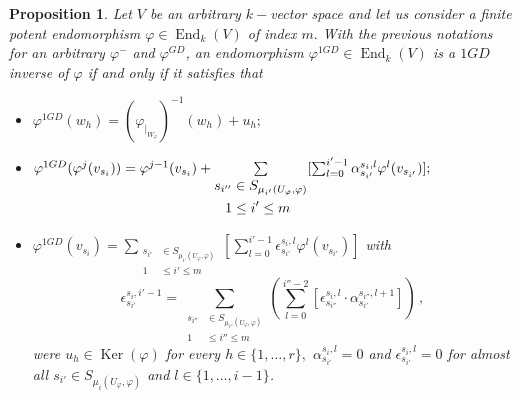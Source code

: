 \documentclass[10pt,a4paper]{amsart}
\newtheorem{prop}[defn]{Proposition}
\theoremstyle{plain}
\theoremstyle{remark}
\numberwithin{equation}{section} \numberwithin{defn}{section}
\newcommand\ed{\operatorname{End}}
\newcommand\Ker{\operatorname{Ker}}
\newcommand{\f}{\varphi}
\begin{document}
\begin{prop}\label{P: Charact1GDFP}
Let $V$ be an arbitrary $k-$vector space and let us consider a finite potent endomorphism $\f \in \ed_k(V)$ of index $m.$ With the previous notations for an arbitrary $\f^-$ and $\f^{GD}$, an endomorphism $\f^{1GD}\in \ed_k(V)$ is a $1GD$ inverse of $\f$ if and only if it satisfies that \begin{itemize}
\item $\f^{1GD}(w_h)=(\f_{\vert_{W_{\f}}})^{-1}(w_h)+u_h;$
\item $\f^{1GD}(\f^j(v_{s_i}))=\f^{j-1}(v_{s_i})+ \underset {\begin{aligned} s_{i''} &\in S_{{\mu}_{i'} (U_\varphi, \varphi)} \\ 1 &\leq i' \leq m \end{aligned}} \sum [\sum_{l=0}^{i'-1} \alpha_{s_{i'}}^{s_i,l} \varphi^{l} ({{v_{s_{i'}}}})]; \medskip $
\item $\f^{1GD}(v_{s_i})=\underset {\begin{aligned} s_{i'} &\in S_{{\mu}_{i'} (U_\varphi, \varphi)} \\ 1 &\leq i' \leq m \end{aligned}} \sum [\sum_{l=0}^{i'-1} \epsilon_{s_{i'}}^{s_i,l} \varphi^{l} ({{v_{s_{i'}}}})]$ with \begin{equation}
\epsilon_{s_{i'}}^{s_i,i'-1} = \underset {\begin{aligned} s_{i''} &\in S_{{\mu}_{i''} (U_\varphi, \varphi)} \\ 1 &\leq i'' \leq m \end{aligned}} \sum {( \sum_{l=0}^{i''-2} [\epsilon_{s_{i''}}^{s_i,l} \cdot \alpha_{s_{i'}}^{s_{i''},l+1}] )}\, 
,\end{equation}
 were $u_h\in \Ker(\f)$ for every $h\in \{1,\dots,r \},$ $\alpha_{s_{i'}}^{s_i,l}=0$ and $\epsilon_{s_{i'}}^{s_i,l} = 0$ for almost all  $s_{i'} \in S_{{\mu}_i (U_\varphi, \varphi)}$ and $l\in \{1, \dots, i-1\}$.
\end{itemize}

\end{prop}
\end{document}
